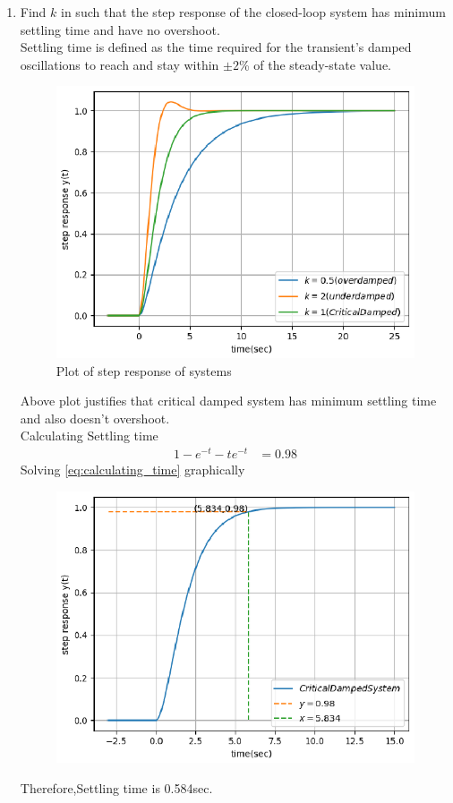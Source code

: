 \begin{enumerate}[label=\thesubsection.\arabic*.,ref=\thesubsection.\theenumi]
\item  Find $k$ in  such that the step response of the closed-loop system has minimum settling time and have no overshoot.\\
\solution Settling time is defined as the time required for the transient's damped oscillations to
reach and stay within $\pm 2$\% of the steady-state value.
\begin{figure}[!h]
\includegraphics[width=\columnwidth]{./figures/ee18btech11035_4.eps}
\caption{Plot of step response of systems}
\label{fig:ee18btech11035_y(t)}
\end{figure}
Above plot justifies that critical damped system  has minimum settling time and also doesn't overshoot.\\
Calculating Settling time\\
\begin{align}
    \label{eq:calculating_time}
    1-e^{-t}-te^{-t}&=0.98
\end{align}
Solving \eqref{eq:calculating_time} graphically\\
\begin{figure}[!h]
\includegraphics[width=\columnwidth]{./figures/ee18btech11035_5.eps}
\caption{}
\label{fig:ee18btech11035_settling}
\end{figure}

Therefore,Settling time is 0.584sec.
\end{enumerate}
